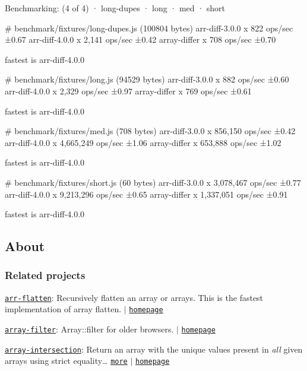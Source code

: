 \begin{DoxyCode}
Benchmarking: (4 of 4)
 · long-dupes
 · long
 · med
 · short

# benchmark/fixtures/long-dupes.js (100804 bytes)
  arr-diff-3.0.0 x 822 ops/sec ±0.67%
  arr-diff-4.0.0 x 2,141 ops/sec ±0.42%
  array-differ x 708 ops/sec ±0.70%

  fastest is arr-diff-4.0.0

# benchmark/fixtures/long.js (94529 bytes)
  arr-diff-3.0.0 x 882 ops/sec ±0.60%
  arr-diff-4.0.0 x 2,329 ops/sec ±0.97%
  array-differ x 769 ops/sec ±0.61%

  fastest is arr-diff-4.0.0

# benchmark/fixtures/med.js (708 bytes)
  arr-diff-3.0.0 x 856,150 ops/sec ±0.42%
  arr-diff-4.0.0 x 4,665,249 ops/sec ±1.06%
  array-differ x 653,888 ops/sec ±1.02%

  fastest is arr-diff-4.0.0

# benchmark/fixtures/short.js (60 bytes)
  arr-diff-3.0.0 x 3,078,467 ops/sec ±0.77%
  arr-diff-4.0.0 x 9,213,296 ops/sec ±0.65%
  array-differ x 1,337,051 ops/sec ±0.91%

  fastest is arr-diff-4.0.0
\end{DoxyCode}


\subsection*{About}

\subsubsection*{Related projects}


\begin{DoxyItemize}
\item \href{https://www.npmjs.com/package/arr-flatten}{\tt arr-\/flatten}\+: Recursively flatten an array or arrays. This is the fastest implementation of array flatten. $\vert$ \href{https://github.com/jonschlinkert/arr-flatten}{\tt homepage}
\item \href{https://www.npmjs.com/package/array-filter}{\tt array-\/filter}\+: Array\+::filter for older browsers. $\vert$ \href{https://github.com/juliangruber/array-filter}{\tt homepage}
\item \href{https://www.npmjs.com/package/array-intersection}{\tt array-\/intersection}\+: Return an array with the unique values present in {\itshape all} given arrays using strict equality… \href{https://github.com/jonschlinkert/array-intersection}{\tt more} $\vert$ \href{https://github.com/jonschlinkert/array-intersection}{\tt homepage}
\end{DoxyItemize}

